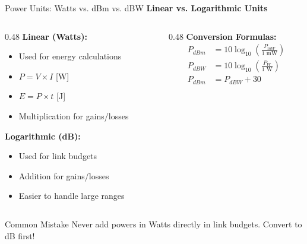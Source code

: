 \documentclass[aspectratio=169,11pt]{beamer}
\begin{document}
\begin{frame}{Power Units: Watts vs. dBm vs. dBW}
    \textbf{Linear vs. Logarithmic Units}
    
    \vspace{0.3cm}
    \begin{columns}[T]
        \begin{column}{0.48\textwidth}
            \textbf{Linear (Watts):}
            \begin{itemize}
                \item Used for energy calculations
                \item $P = V \times I$ [W]
                \item $E = P \times t$ [J]
                \item Multiplication for gains/losses
            \end{itemize}
            
            \vspace{0.3cm}
            \textbf{Logarithmic (dB):}
            \begin{itemize}
                \item Used for link budgets
                \item Addition for gains/losses
                \item Easier to handle large ranges
            \end{itemize}
        \end{column}
        \begin{column}{0.48\textwidth}
            \textbf{Conversion Formulas:}
            \begin{align*}
                P_{dBm} &= 10 \log_{10}\left(\frac{P_{mW}}{1 \text{ mW}}\right) \\[0.3cm]
                P_{dBW} &= 10 \log_{10}\left(\frac{P_{W}}{1 \text{ W}}\right) \\[0.3cm]
                P_{dBm} &= P_{dBW} + 30
            \end{align*}
        \end{column}
    \end{columns}
    
    \vspace{0.3cm}
    \begin{alertblock}{Common Mistake}
        Never add powers in Watts directly in link budgets. Convert to dB first!
    \end{alertblock}
\end{frame}
\end{document}
